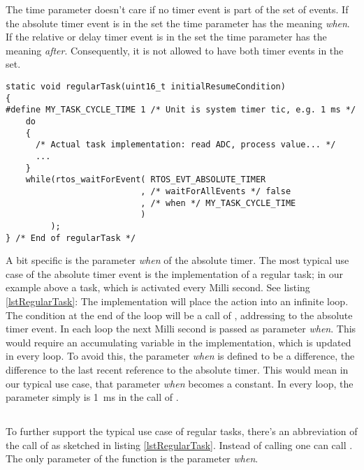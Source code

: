 The time parameter doesn't care if no timer event is part of the set of
events. If the absolute timer event is in the set the time parameter has
the meaning \emph{when}. If the relative or delay timer event is in the
set the time parameter has the meaning \emph{after}. Consequently, it is
not allowed to have both timer events in the set.

\begin{lstlisting}[float, caption=Typical use case: regular task,
label=lstRegularTask, captionpos=b]
static void regularTask(uint16_t initialResumeCondition)
{
#define MY_TASK_CYCLE_TIME 1 /* Unit is system timer tic, e.g. 1 ms */
    do
    {
      /* Actual task implementation: read ADC, process value... */
      ...
    }
    while(rtos_waitForEvent( RTOS_EVT_ABSOLUTE_TIMER
                           , /* waitForAllEvents */ false
                           , /* when */ MY_TASK_CYCLE_TIME
                           )
         );
} /* End of regularTask */
\end{lstlisting}

A bit specific is the parameter \emph{when} of the absolute timer. The
most typical use case of the absolute timer event is the implementation of
a regular task; in our example above a task, which is activated every
Milli second. See listing \ref{lstRegularTask}: The implementation will
place the action into an infinite loop. The  condition at the
end of the loop will be a call of , addressing
to the absolute timer event. In each loop the next Milli second is passed
as parameter \emph{when}. This would require an accumulating variable in
the implementation, which is updated in every loop. To avoid this, the
parameter \emph{when} is defined to be a difference, the difference to the
last recent reference to the absolute timer. This would mean in our typical
use case, that parameter \emph{when} becomes a constant. In every loop,
the parameter simply is 1~ms in the call of .


\subsection{}

To further support the typical use case of regular tasks, there's an
abbreviation of the call of  as sketched in
listing \ref{lstRegularTask}. Instead of calling
 one can call
. The only parameter of the
function is the parameter \emph{when}.

